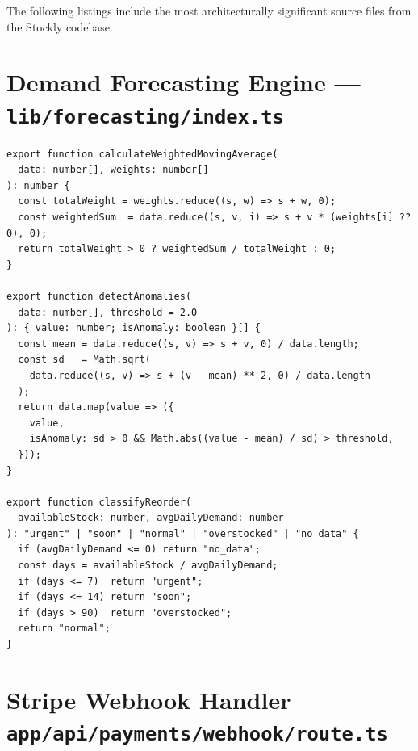 \documentclass[12pt,a4paper]{report}
\begin{document}
The following listings include the most architecturally significant source files from the Stockly codebase.

\section{Demand Forecasting Engine --- \texttt{lib/forecasting/index.ts}}

\begin{lstlisting}[caption={Weighted moving average, z-score anomaly detection, and reorder classification}]
export function calculateWeightedMovingAverage(
  data: number[], weights: number[]
): number {
  const totalWeight = weights.reduce((s, w) => s + w, 0);
  const weightedSum  = data.reduce((s, v, i) => s + v * (weights[i] ?? 0), 0);
  return totalWeight > 0 ? weightedSum / totalWeight : 0;
}

export function detectAnomalies(
  data: number[], threshold = 2.0
): { value: number; isAnomaly: boolean }[] {
  const mean = data.reduce((s, v) => s + v, 0) / data.length;
  const sd   = Math.sqrt(
    data.reduce((s, v) => s + (v - mean) ** 2, 0) / data.length
  );
  return data.map(value => ({
    value,
    isAnomaly: sd > 0 && Math.abs((value - mean) / sd) > threshold,
  }));
}

export function classifyReorder(
  availableStock: number, avgDailyDemand: number
): "urgent" | "soon" | "normal" | "overstocked" | "no_data" {
  if (avgDailyDemand <= 0) return "no_data";
  const days = availableStock / avgDailyDemand;
  if (days <= 7)  return "urgent";
  if (days <= 14) return "soon";
  if (days > 90)  return "overstocked";
  return "normal";
}
\end{lstlisting}

\section{Stripe Webhook Handler --- \texttt{app/api/payments/webhook/route.ts}}
\end{document}
